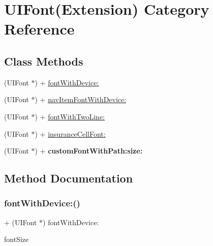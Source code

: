 \hypertarget{category_u_i_font_07_extension_08}{}\section{U\+I\+Font(Extension) Category Reference}
\label{category_u_i_font_07_extension_08}
\subsection*{Class Methods}
\begin{DoxyCompactItemize}
\item 
(U\+I\+Font $\ast$) + \mbox{\hyperlink{category_u_i_font_07_extension_08_acb4a344503cf9605b2195fa475d3af03}{font\+With\+Device\+:}}
\item 
(U\+I\+Font $\ast$) + \mbox{\hyperlink{category_u_i_font_07_extension_08_a0f373aaa5d0e74e3a9a3bc74e70ef5fe}{nav\+Item\+Font\+With\+Device\+:}}
\item 
(U\+I\+Font $\ast$) + \mbox{\hyperlink{category_u_i_font_07_extension_08_a82c1289ca2c770cb90a7b81acf41db98}{font\+With\+Two\+Line\+:}}
\item 
(U\+I\+Font $\ast$) + \mbox{\hyperlink{category_u_i_font_07_extension_08_a9e3c776d716f8a5c8857ce980b9b53ff}{insurance\+Cell\+Font\+:}}
\item 
\mbox{\label{category_u_i_font_07_extension_08_a9fe668cdf3d49f115d97cac97a6f1ce3}} 
(U\+I\+Font $\ast$) + {\bfseries custom\+Font\+With\+Path\+:size\+:}
\end{DoxyCompactItemize}


\subsection{Method Documentation}
\mbox{\label{category_u_i_font_07_extension_08_acb4a344503cf9605b2195fa475d3af03}} 
\subsubsection{\texorpdfstring{font\+With\+Device\+:()}{fontWithDevice:()}}
{\footnotesize\ttfamily + (U\+I\+Font $\ast$) font\+With\+Device\+: \begin{DoxyParamCaption}\item[{(C\+G\+Float)}]{font\+Size }\end{DoxyParamCaption}}

